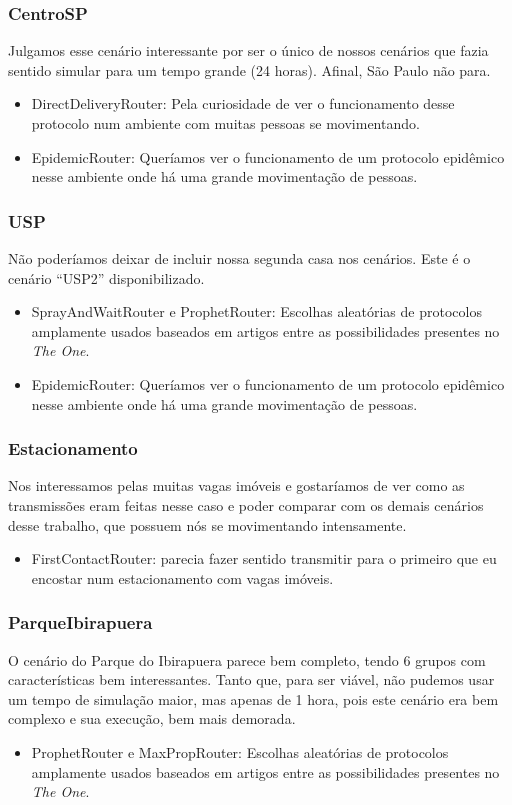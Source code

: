 \documentclass[conference]{IEEEtran}
\begin{document}
\subsubsection{CentroSP}
Julgamos esse cenário interessante por ser o único de nossos cenários que fazia sentido simular para um tempo grande (24 horas). Afinal, São Paulo não para.
\begin{itemize}
\item DirectDeliveryRouter: Pela curiosidade de ver o funcionamento desse protocolo num ambiente com muitas pessoas se movimentando.
\item EpidemicRouter: Queríamos ver o funcionamento de um protocolo epidêmico nesse ambiente onde há uma grande
movimentação de pessoas.
\end{itemize}

\subsubsection{USP}
Não poderíamos deixar de incluir nossa segunda casa nos cenários. Este é o cenário \textquotedblleft USP2\textquotedblright{} disponibilizado.
\begin{itemize}
\item SprayAndWaitRouter e ProphetRouter: Escolhas aleatórias de protocolos amplamente usados baseados em artigos entre as possibilidades presentes no \emph{The One}.
\item EpidemicRouter: Queríamos ver o funcionamento de um protocolo epidêmico nesse ambiente onde há uma grande
movimentação de pessoas.
\end{itemize}

\subsubsection{Estacionamento}
Nos interessamos pelas muitas vagas imóveis e gostaríamos de ver como as transmissões eram feitas nesse caso e poder comparar com os demais cenários desse trabalho, que possuem nós se movimentando intensamente.
\begin{itemize}
\item FirstContactRouter: parecia fazer sentido transmitir para o primeiro que eu encostar num estacionamento com vagas imóveis.
\end{itemize}

\subsubsection{ParqueIbirapuera}
O cenário do Parque do Ibirapuera parece bem completo, tendo 6 grupos com características bem interessantes. Tanto que, para ser viável, não pudemos usar um tempo de simulação maior, mas apenas de 1 hora, pois este cenário era bem complexo e sua execução, bem mais demorada.
\begin{itemize}
\item ProphetRouter e MaxPropRouter: Escolhas aleatórias de protocolos amplamente usados baseados em artigos entre as possibilidades presentes no \emph{The One}.
\end{itemize}
\end{document}
